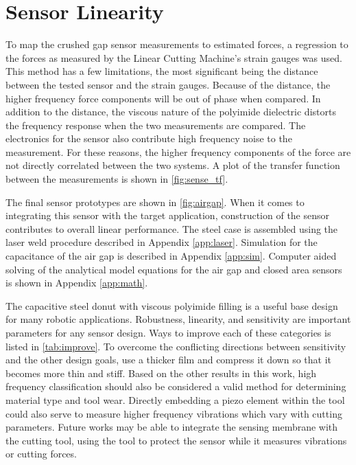 \chapter{Sensor Linearity
\label{chap:10}}

To map the crushed gap sensor measurements to estimated forces, 
a regression to the forces as measured by the 
Linear Cutting Machine's strain gauges was used.
This method has a few limitations, the most significant
being the distance between the tested sensor and the strain gauges.
Because of the distance, the higher frequency force components will
be out of phase when compared. 
In addition to the distance, the viscous nature of the polyimide dielectric distorts the 
frequency response when the two measurements are compared.
The electronics for the sensor also contribute high frequency noise to the measurement.
For these reasons, the higher frequency components of the force are not directly correlated 
between the two systems. 
A plot of the transfer function between the measurements is shown in \ref{fig:sense_tf}.

The final sensor prototypes are shown in \ref{fig:airgap}.
When it comes to integrating this sensor with the target application,
construction of the sensor contributes to overall linear performance.
The steel case is assembled using the laser weld procedure described in Appendix \ref{app:laser}.
Simulation for the capacitance of the air gap is described in Appendix \ref{app:sim}.
Computer aided solving of the analytical model equations for the air gap and closed area sensors
is shown in Appendix \ref{app:math}.

The capacitive steel donut with viscous polyimide filling is a useful base design
for many robotic applications. Robustness, linearity, and sensitivity are important 
parameters for any sensor design. Ways to improve each of these categories is listed in \ref{tab:improve}.
To overcome the conflicting directions between sensitivity and the other design goals,
 use a thicker film and compress it down so that it becomes more thin and stiff.
Based on the other results in this work, high frequency classification 
should also be considered a valid method for
 determining material type and tool wear. 
Directly embedding a piezo element within the tool could
also serve to measure higher frequency vibrations which vary with cutting parameters.
Future works may be able to integrate the sensing membrane with the cutting tool,
using the tool to protect the sensor while it measures vibrations or cutting forces.


